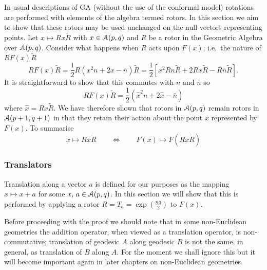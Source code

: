 In usual descriptions of GA (without the use of the conformal model)
rotations are performed with elements of the algebra termed
rotors. In this section we aim to show that these rotors may be used
unchanged on the null vectors representing points.
Let $x \mapsto Rx\tilde{R}$ with $x\in {\mathcal{A}}(p,q)$ and $R$ be a
rotor in the Geometric Algebra over ${\mathcal{A}}(p,q)$. Consider
what happens when $R$ acts upon $F(x)$; i.e.\ the nature of
$RF(x)\tilde{R}$
%
\[ RF(x)\tilde{R} =\frac{1}{2} R(x^2n + 2x - \bar{n})\tilde{R} =\frac{1}{2}[ x^2Rn\tilde{R}
+ 2Rx\tilde{R} - R\bar{n}\tilde{R}]. \]
%
It is straightforward to show that this
commutes with
$n$ and $\bar{n}$  
so
%
\begin{equation} RF(x)\tilde{R} = \frac{1}{2}(\hat{x}^2n + 2\hat{x} - \bar{n})
	\end{equation}
%
where $\hat{x}=R x \tilde{R}$. We have therefore shown that rotors in
${\mathcal{A}}(p,q)$ remain rotors in ${\mathcal{A}}(p+1,q+1)$ in that they retain
their action about the point $x$ represented by $F(x)$. To summarise
%
\begin{equation} x \mapsto Rx\tilde{R} \qquad \Leftrightarrow \qquad F(x) \mapsto
F(Rx\tilde{R}) \end{equation}
%

\subsubsection{Translators}

Translation along a vector $a$ is defined for our purposes as the
mapping $x\mapsto x+a$ for some $x,\,a \in \mathcal{A}(p,q)$.
In this
section we will show that this is performed by applying a 
rotor $R=T_a = \exp\left({\frac{na}{2}}\right)$ to $F(x)$.

Before proceeding with the proof we should note that in some non-Euclidean
geometries the addition operator, when viewed as a translation operator, is
non-commutative; translation of geodesic $A$ along geodesic $B$ is not the
same, in general, as translation of $B$ along $A$. For the moment we shall
ignore this but it will become important again in later chapters on 
non-Euclidean geometries.

